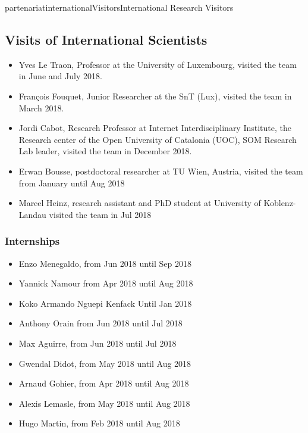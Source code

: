 \documentclass{ra2018}
\begin{document}
\begin{module}{partenariat}{internationalVisitors}{International Research Visitors}

\subsection{Visits of International Scientists}

\begin{itemize}
	\item Yves Le Traon, Professor at the University of Luxembourg, visited the team in June and July 2018.
	\item François Fouquet, Junior Researcher at the SnT (Lux), visited the team in March 2018.
	\item Jordi Cabot, Research Professor at Internet Interdisciplinary Institute, the Research center of the Open University of Catalonia (UOC), SOM Research Lab leader, visited the team in December 2018.
	\item Erwan Bousse, postdoctoral researcher at TU Wien, Austria, visited the team from January until Aug 2018
	\item Marcel Heinz, research assistant and PhD student at  University of Koblenz-Landau visited the team in Jul 2018
	
\end{itemize}



   \subsubsection{Internships}

\begin{itemize}
\item Enzo Menegaldo, from Jun 2018 until Sep 2018
\item Yannick Namour from Apr 2018 until Aug 2018
\item Koko Armando Nguepi Kenfack Until Jan 2018
\item Anthony Orain from Jun 2018 until Jul 2018
\item Max Aguirre, from Jun 2018 until Jul 2018
\item Gwendal Didot, from May 2018 until Aug 2018
\item Arnaud Gohier, from Apr 2018 until Aug 2018
\item Alexis Lemasle, from May 2018 until Aug 2018
\item Hugo Martin, from Feb 2018 until Aug 2018
\end{itemize}


\end{module}
\end{document}
